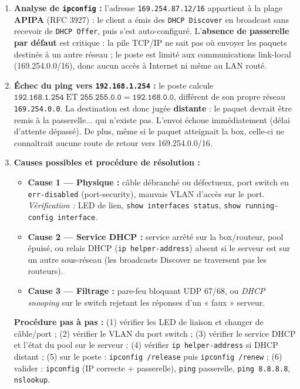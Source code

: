 \documentclass[11pt]{article}
\begin{document}
\begin{corrige}
\begin{enumerate}
    \item \textbf{Analyse de \texttt{ipconfig} :} l'adresse \texttt{169.254.87.12/16} appartient à la plage \textbf{APIPA} (RFC 3927) : le client a émis des \texttt{DHCP Discover} en broadcast sans recevoir de \texttt{DHCP Offer}, puis s'est auto-configuré. L'\textbf{absence de passerelle par défaut} est critique : la pile TCP/IP ne sait pas où envoyer les paquets destinés à un autre réseau ; le poste est limité aux communications link-local (169.254.0.0/16), donc aucun accès à Internet ni même au LAN routé.
    \item \textbf{Échec du ping vers \texttt{192.168.1.254} :} le poste calcule $\texttt{192.168.1.254} \mathbin{\text{ET}} \texttt{255.255.0.0} = \texttt{192.168.0.0}$, différent de son propre réseau \texttt{169.254.0.0}. La destination est donc jugée \textbf{distante} : le paquet devrait être remis à la passerelle... qui n'existe pas. L'envoi échoue immédiatement (délai d'attente dépassé). De plus, même si le paquet atteignait la box, celle-ci ne connaîtrait aucune route de retour vers 169.254.0.0/16.
    \item \textbf{Causes possibles et procédure de résolution :}
    \begin{itemize}
        \item \textbf{Cause 1 — Physique :} câble débranché ou défectueux, port switch en \texttt{err-disabled} (port-security), mauvais VLAN d'accès sur le port. \emph{Vérification :} LED de lien, \texttt{show interfaces status}, \texttt{show running-config interface}.
        \item \textbf{Cause 2 — Service DHCP :} service arrêté sur la box/routeur, pool épuisé, ou relais DHCP (\texttt{ip helper-address}) absent si le serveur est sur un autre sous-réseau (les broadcasts Discover ne traversent pas les routeurs).
        \item \textbf{Cause 3 — Filtrage :} pare-feu bloquant UDP 67/68, ou \emph{DHCP snooping} sur le switch rejetant les réponses d'un « faux » serveur.
    \end{itemize}
    \textbf{Procédure pas à pas :} (1) vérifier les LED de liaison et changer de câble/port ; (2) vérifier le VLAN du port switch ; (3) vérifier le service DHCP et l'état du pool sur le serveur ; (4) vérifier \texttt{ip helper-address} si DHCP distant ; (5) sur le poste : \texttt{ipconfig /release} puis \texttt{ipconfig /renew} ; (6) valider : \texttt{ipconfig} (IP correcte + passerelle), \texttt{ping} passerelle, \texttt{ping 8.8.8.8}, \texttt{nslookup}.
\end{enumerate}
\end{corrige}
\end{document}
